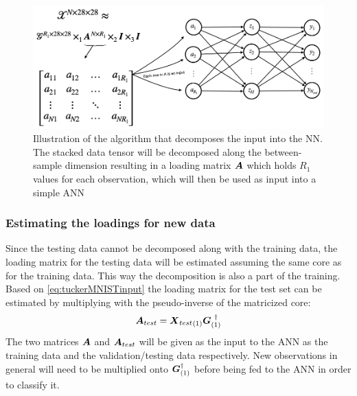 \begin{figure}
    \centering
    \includegraphics[width=\linewidth]{Pics/05_methodology/input_decomp_illustration.png}
    \captionsetup{width=.95\linewidth}
    \caption{Illustration of the algorithm that decomposes the input into the NN. The stacked data tensor will be decomposed along the between-sample dimension resulting in a loading matrix $\boldsymbol{A}$ which holds $R_1$ values for each observation, which will then be used as input into a simple ANN}
    \label{fig:illustrationinputdecomp}
\end{figure}

\subsubsection{Estimating the loadings for new data}
Since the testing data cannot be decomposed along with the training data, the loading matrix for the testing data will be estimated assuming the same core as for the training data. This way the decomposition is also a part of the training. Based on \eqref{eq:tuckerMNISTinput} the loading matrix for the test set can be estimated by multiplying with the pseudo-inverse of the matricized core:
\begin{equation}
    \boldsymbol{A}_{test} = {\boldsymbol{X}_{test}}_{(1)} \boldsymbol{G}_{(1)}^{\ \dagger}
\end{equation}
The two matrices $\boldsymbol{A}$ and $\boldsymbol{A}_{test}$ will be given as the input to the ANN as the training data and the validation/testing data respectively. New observations in general will need to be multiplied onto $\boldsymbol{G}_{(1)}^{\dagger}$ before being fed to the ANN in order to classify it.



